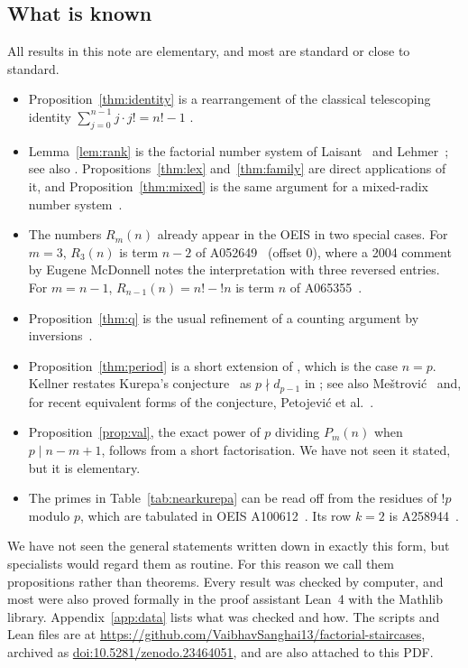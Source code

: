 \documentclass[11pt]{amsart}
\theoremstyle{plain}
\theoremstyle{definition}
\theoremstyle{remark}
\begin{document}
\subsection*{What is known}
All results in this note are elementary, and most are standard or close to
standard.
\begin{itemize}
  \item Proposition~\ref{thm:identity} is a rearrangement of the classical
        telescoping identity $\sum_{j=0}^{n-1}j\cdot j!=n!-1$ \cite{GKP}.
  \item Lemma~\ref{lem:rank} is the factorial number system of
        Laisant~\cite{Laisant} and Lehmer~\cite{Lehmer}; see also
        \cite[\S7.2.1.2]{TAOCP4A}. Propositions~\ref{thm:lex}
        and~\ref{thm:family} are direct applications of it, and
        Proposition~\ref{thm:mixed} is the same argument for a mixed-radix
        number system~\cite{TAOCP2,Fraenkel}.
  \item The numbers $R_m(n)$ already appear in the OEIS in two special cases.
        For $m=3$, $R_3(n)$ is term $n-2$ of A052649~\cite{A052649} (offset
        $0$), where a 2004 comment by Eugene McDonnell notes the
        interpretation with three reversed entries. For $m=n-1$,
        $R_{n-1}(n)=n!-{!n}$ is term $n$ of A065355~\cite{A065355}.
  \item Proposition~\ref{thm:q} is the usual refinement of a counting argument
        by inversions~\cite[Ch.~1]{EC1}.
  \item Proposition~\ref{thm:period} is a short extension of
        \cite[Lemma~2.4]{Kellner}, which is the case $n=p$. Kellner restates
        Kurepa's conjecture~\cite{Kurepa,Guy} as $p\nmid d_{p-1}$ in
        \cite[Lemma~2.1 and Corollary~2.2]{Kellner}; see also
        Me\v{s}trovi\'c~\cite{Mestrovic} and, for recent equivalent forms of
        the conjecture, Petojevi\'c et al.~\cite{Petojevic2023}.
  \item Proposition~\ref{prop:val}, the exact power of $p$ dividing $P_m(n)$
        when $p\mid n-m+1$, follows from a short factorisation. We have not
        seen it stated, but it is elementary.
  \item The primes in Table~\ref{tab:nearkurepa} can be read off from the
        residues of $!p$ modulo $p$, which are tabulated in OEIS
        A100612~\cite{A100612}. Its row $k=2$ is A258944~\cite{A258944}.
\end{itemize}
We have not seen the general statements written down in exactly this form,
but specialists would regard them as routine. For this reason we call them
propositions rather than theorems. Every result was checked by computer, and
most were also proved formally in the proof assistant Lean~4 with the Mathlib
library. Appendix~\ref{app:data} lists what was checked and how. The scripts
and Lean files are at
\url{https://github.com/VaibhavSanghai13/factorial-staircases}, archived as
\href{https://doi.org/10.5281/zenodo.23464051}{doi:10.5281/zenodo.23464051},
and are also attached to this PDF.
\end{document}
